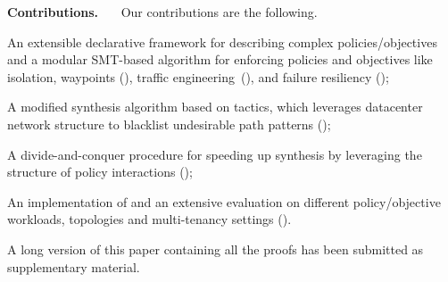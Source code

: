 \noindent \textbf{Contributions.} \ \ \ Our contributions are the following.
\begin{compactitemize}
\item An extensible declarative framework for describing
  complex policies/objectives and a modular SMT-based algorithm for enforcing policies and objectives
  like isolation, waypoints (), traffic engineering~(), and 
  failure resiliency ();
\item A modified synthesis algorithm based on tactics, which leverages datacenter network structure
  to blacklist undesirable path patterns ();
\item A divide-and-conquer procedure for speeding up synthesis by leveraging the 
structure of policy interactions ();
\item An implementation of \Name and an extensive evaluation on
  different policy/objective workloads, topologies and multi-tenancy
  settings ().
\end{compactitemize}

\iffull\else
A long version
of this paper containing all the proofs has been submitted as supplementary material.
\fi

